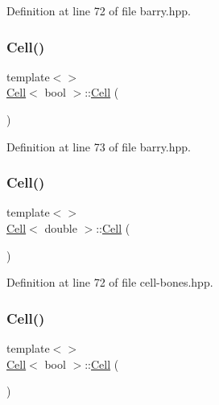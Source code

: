 Definition at line 72 of file barry.\+hpp.

\mbox{\label{class_cell_aef4b64101b33e2349ceea132b962d137}} 
\subsubsection{\texorpdfstring{Cell()}{Cell()}\hspace{0.1cm}{\footnotesize\ttfamily [8/10]}}
{\footnotesize\ttfamily template$<$$>$ \\
\hyperlink{class_cell}{Cell}$<$ bool $>$\+::\hyperlink{class_cell}{Cell} (\begin{DoxyParamCaption}{ }\end{DoxyParamCaption})\hspace{0.3cm}{\ttfamily [inline]}}



Definition at line 73 of file barry.\+hpp.

\mbox{\label{class_cell_a5ecdaddaf4661a9a8fe6f0ed61595847}} 
\subsubsection{\texorpdfstring{Cell()}{Cell()}\hspace{0.1cm}{\footnotesize\ttfamily [9/10]}}
{\footnotesize\ttfamily template$<$$>$ \\
\hyperlink{class_cell}{Cell}$<$ double $>$\+::\hyperlink{class_cell}{Cell} (\begin{DoxyParamCaption}{ }\end{DoxyParamCaption})\hspace{0.3cm}{\ttfamily [inline]}}



Definition at line 72 of file cell-\/bones.\+hpp.

\mbox{\label{class_cell_aef4b64101b33e2349ceea132b962d137}} 
\subsubsection{\texorpdfstring{Cell()}{Cell()}\hspace{0.1cm}{\footnotesize\ttfamily [10/10]}}
{\footnotesize\ttfamily template$<$$>$ \\
\hyperlink{class_cell}{Cell}$<$ bool $>$\+::\hyperlink{class_cell}{Cell} (\begin{DoxyParamCaption}{ }\end{DoxyParamCaption})\hspace{0.3cm}{\ttfamily [inline]}}



